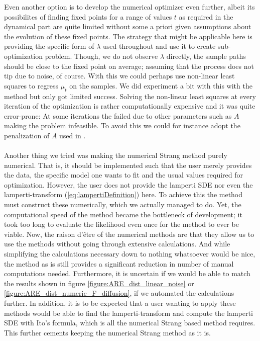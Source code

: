 Even another option is to develop the numerical optimizer even further, albeit its possibilites of finding fixed points for a range of values $t$ as required in the dynamical part are quite limited without some a priori given assumptions about the evolution of these fixed points. The strategy that might be applicable here is providing the specific form of $\lambda$ used throughout and use it to create sub-optimization problem. Though, we do not observe $\lambda$ directly, the sample paths should be close to the fixed point on average; assuming that the process does not tip due to noise, of course. With this we could perhaps use non-linear least squares to regress $\mu_t$ on the samples. We did experiment a bit with this with the method  but only got limited success. Solving the non-linear least squares at every iteration of the optimization is rather computationally expensive and it was quite error-prone: At some iterations the  failed due to other parameters such as $A$ making the problem infeasible. To avoid this we could for instance adopt the penalization of $A$ used in \cite{Ditlevsen2023}.\\\\
Another thing we tried was making the numerical Strang method purely numerical. That is, it should be implemented such that the user merely provides the data, the specific model one wants to fit and the usual values required for optimization. However, the user does not provide the lamperti SDE nor even the lamperti-transform (\ref{eq:lampertiDefinition}) here. To achieve this the method must construct these numerically, which we actually managed to do. Yet, the computational speed of the method became the bottleneck of development; it took too long to evaluate the likelihood even once for the method to ever be viable. Now, the raison d'être of the numerical methods are that they allow us to use the methods without going through extensive calculations. And while simplifying the calculations necessary down to nothing whatsoever would be nice, the method as is still provides a significant reduction in number of manual computations needed. Furthermore, it is uncertain if we would be able to match the results shown in figure \ref{figure:ARE_dist_linear_noise} or \ref{figure:ARE_dist_numeric_F_diffusion}, if we automated the calculations further. In addition, it is to be expected that a user wanting to apply these methods would be able to find the lamperti-transform and compute the lamperti SDE with Ito's formula, which is all the numerical Strang based method requires. This further cements keeping the numerical Strang method as it is.\\\\
